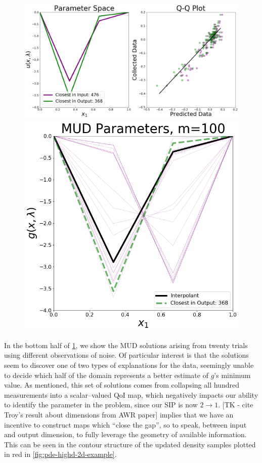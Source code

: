 \begin{figure}
\centering
  \includegraphics[width=0.95\linewidth]{figures/pde-highd/pde-highd_proj_D2.png}
  \includegraphics[width=0.95\linewidth]{figures/pde-highd/pde-highd_pair_D2-1_m100.png}
\caption{
}
\label{fig:pde-highd-2d-scalar-mud}
\end{figure}

In the bottom half of \ref{fig:pde-highd-2d-scalar-mud}, we show the MUD solutions arising from twenty trials using different observations of noise.
Of particular interest is that the solutions seem to discover one of two types of explanations for the data, seemingly unable to decide which half of the domain represents a better estimate of $g$'s minimum value.
As mentioned, this set of solutions comes from collapsing all hundred measurements into a scalar--valued QoI map, which negatively impacts our ability to identify the parameter in the problem, since our SIP is now $2\rightarrow 1$.
[TK - cite Troy's result about dimensions from AWR paper] implies that we have an incentive to construct maps which ``close the gap'', so to speak, between input and output dimension, to fully leverage the geometry of available information.
This can be seen in the contour structure of the updated density samples plotted in red in \ref{fig:pde-highd-2d-example}.


